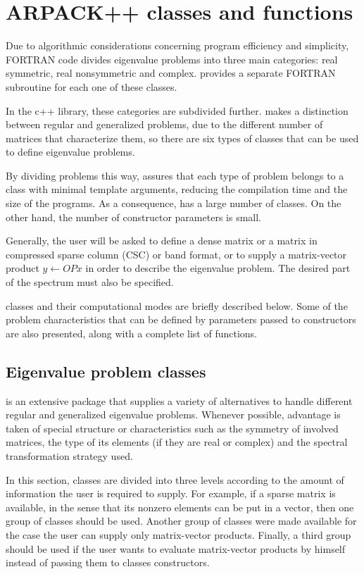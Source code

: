 \chapter{ARPACK++ classes and functions}

Due to algorithmic considerations concerning program efficiency and simplicity, \ARP{} FORTRAN code divides eigenvalue problems into three main categories: real symmetric, real nonsymmetric and complex. \ARP{} provides a separate FORTRAN subroutine for each one of these classes.

In the c++ library, these categories are subdivided further. \ARPP{} makes a distinction between regular and generalized problems, due to the different number of matrices that characterize them, so there are six types of classes that can be used to define eigenvalue problems.

By dividing problems this way, \ARPP{} assures that each type of problem belongs to a class with minimal template arguments, reducing the compilation time and the size of the programs. As a consequence, \ARPP{} has a large number of classes. On the other hand, the number of constructor parameters is small.

Generally, the user will be asked to define a dense matrix or a matrix in compressed sparse column (CSC) or band format, or to supply a matrix-vector product $y\leftarrow OPx$ in order to describe the eigenvalue problem. The desired part of the spectrum must also be specified.

\ARPP{} classes and their computational modes are briefly described below. Some of the problem characteristics that can be defined by parameters passed to constructors are also presented, along with a complete list of \ARPP{} functions. 

\section{Eigenvalue problem classes}

\ARP{} is an extensive package that supplies a variety of alternatives to handle different regular and generalized eigenvalue problems. Whenever possible, advantage is taken of special structure or characteristics such as the symmetry of involved matrices, the type of its elements (if they are real or complex) and the spectral transformation strategy used.

In this section, \ARPP{} classes are divided into three levels according to the amount of information the user is required to supply. For example, if a sparse matrix is available, in the sense that its nonzero elements can be put in a vector, then one group of classes should be used. Another group of classes were made available for the case the user can supply only matrix-vector products. Finally, a third group should be used if the user wants to evaluate matrix-vector products by himself instead of passing them to \ARPP{} classes constructors.

